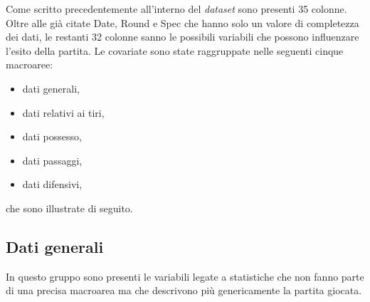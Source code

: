 Come scritto precedentemente all'interno del \emph{dataset} sono presenti 35 colonne. Oltre alle già citate \textsf{Date}, \textsf{Round} e \textsf{Spec} che hanno solo un valore di completezza dei dati, le restanti 32 colonne sanno le possibili variabili che possono influenzare l'esito della partita.
Le covariate sono state raggruppate nelle seguenti cinque macroaree:
\begin{itemize}
	\item dati generali,
	\item dati relativi ai tiri,
	\item dati possesso,
	\item dati passaggi,
	\item dati difensivi,
\end{itemize}

che sono illustrate di seguito.

\subsection{Dati generali}
In questo gruppo sono presenti le variabili legate a statistiche che non fanno parte di una precisa macroarea ma che descrivono più genericamente la partita giocata. 

